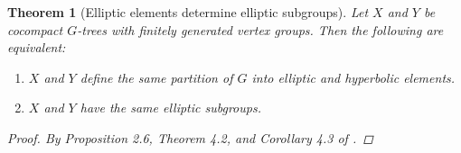 \documentclass[12pt,parskip=full]{report}
\theoremstyle{plain}
\newtheorem{thm}{Theorem}[section]
\theoremstyle{definition}
\begin{document}
\begin{thm}
    [Elliptic elements determine elliptic subgroups]
    \label{thm:ellelesubgroups} 
    Let \(X\) and \(Y\) be cocompact \(G\)-trees with finitely generated vertex groups. Then the following are equivalent:
    \begin{enumerate}
        \item \(X\) and \(Y\) define the same partition of \(G\) into elliptic and hyperbolic elements.
        \item \(X\) and \(Y\) have the same elliptic subgroups.
    \end{enumerate}

    \begin{proof}
    By Proposition 2.6, Theorem 4.2, and Corollary 4.3 of \cite{foresterdeformationrigidity}.
    \end{proof}
    
\end{thm}
\end{document}

